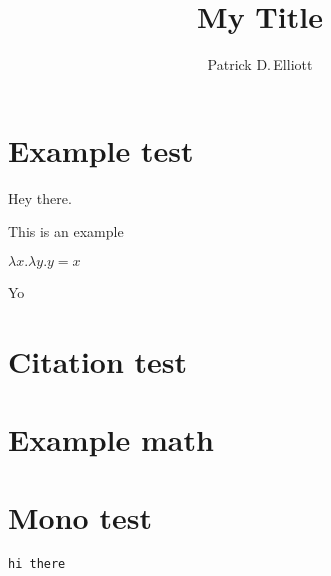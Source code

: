 \documentclass{ling-handout}
\title{My Title}
\author{Patrick D.\,Elliott}
\begin{document}
\begin{addmargin}[0pt]{.3\textwidth}

\maketitle

\section{Example test}

Hey there.

\syncwithnotecolumns[paragraphs]

\ex
This is an example
\xe

\ex
\(λ x . λ y . y = x\)
\xe

Yo

\section{Citation test}

\section{Example math}

\section{Mono test}

\texttt{hi there}

\printbibliography

\end{addmargin}
\end{document}
